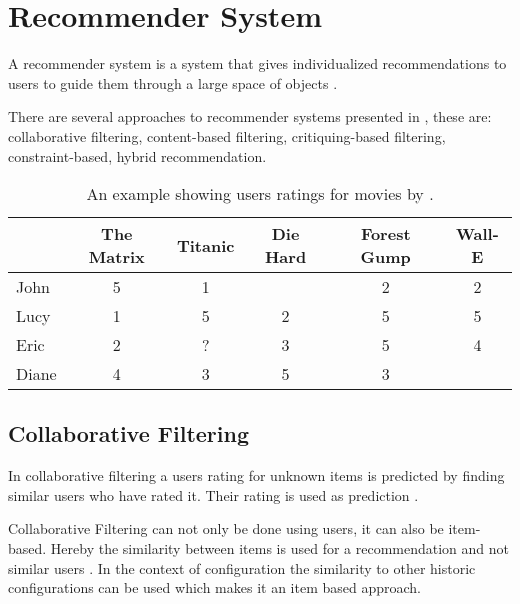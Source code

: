 \section{Recommender System}
\label{sec:Foundations:RecommenderSystem}

A recommender system is a system that gives individualized recommendations to users to guide them through a large space of objects \cite[~ p. 331]{burkeHybridRecommenderSystems2002}.

There are several approaches to recommender systems presented in \cite{felfernigGroupRecommenderSystems2018}, these are: collaborative filtering, content-based filtering, critiquing-based filtering, constraint-based, hybrid recommendation.

\begin{table}
    \centering    
    \begin{tabular}{ l | c | c | c | c | c }
        & The Matrix & Titanic & Die Hard & Forest Gump & Wall-E \\ \hline
         John  & 5 & 1 &   & 2 & 2 \\
         Lucy  & 1 & 5 & 2 & 5 & 5 \\
         Eric  & 2 & ? & 3 & 5 & 4 \\
         Diane & 4 & 3 & 5 & 3 &   \\
    \end{tabular}
    \caption{An example showing users ratings for movies by \citeauthor{ningComprehensiveSurveyNeighborhoodBased2015} \cite{ningComprehensiveSurveyNeighborhoodBased2015}.}
    
    \label{tab:Foundations:RecommenderSystem:MoviePreferences}
\end{table}

\subsection{Collaborative Filtering}
In collaborative filtering a users rating for unknown items is predicted by finding similar users who have rated it. Their rating is used as prediction
\cite[~ pp. 7, 8]{felfernigDecisionTasksBasic2018}.

Collaborative Filtering can not only be done using users, it can also be item-based. Hereby the similarity between items is used for a recommendation and not similar users \cite{ricciRecommenderSystemsHandbook2015}. In the context of configuration the similarity to other historic configurations can be used which makes it an item based approach. 

